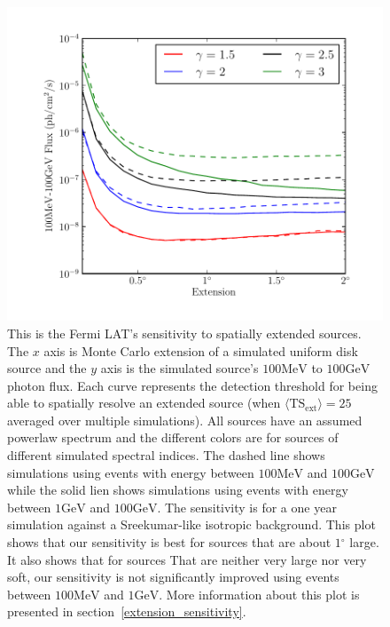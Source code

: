 \documentclass[preprint]{aastex}
\newcommand{\mev}{\text{MeV}\xspace}
\newcommand{\gev}{\text{GeV}\xspace}
\newcommand{\tsext}{{\ensuremath{\text{TS}_\text{ext}}}\xspace}
\renewcommand{\deg}{\ensuremath{^\circ}\xspace}
\begin{document}
\clearpage

\begin{figure}
  \begin{center}
    \includegraphics{mc_plots/index_sensitivity.pdf}
    \end{center}
    \caption{This is the Fermi LAT's sensitivity to spatially
    extended sources. The $x$ axis is Monte Carlo extension of a
    simulated uniform disk source and the $y$ axis is the simulated
    source's $100\mev$ to $100\gev$ photon flux. Each curve represents
    the detection threshold for being able to spatially resolve an
    extended source (when $\langle\tsext\rangle=25$ averaged over
    multiple simulations).  
    All sources have an assumed powerlaw spectrum and the different
    colors are for sources of different simulated spectral indices.
    The dashed line shows simulations using events with energy between 
    $100\mev$ and $100\gev$ while the solid lien shows simulations
    using events with energy between $1\gev$ and $100\gev$.
    The sensitivity is for a one year simulation against a Sreekumar-like
    isotropic background\cite{Sreekumar et al. ApJ 494 pag 523 1998}.
    This plot shows that our sensitivity is best for sources that are
    about $1\deg$ large. It also shows that for sources That are neither
    very large nor very soft, our sensitivity is not significantly
    improved using events between $100\mev$ and $1\gev$.  More information
    about this plot is presented in section~\ref{extension_sensitivity}.
    }\label{index_sensitivity}
  \end{figure}
\end{document}
